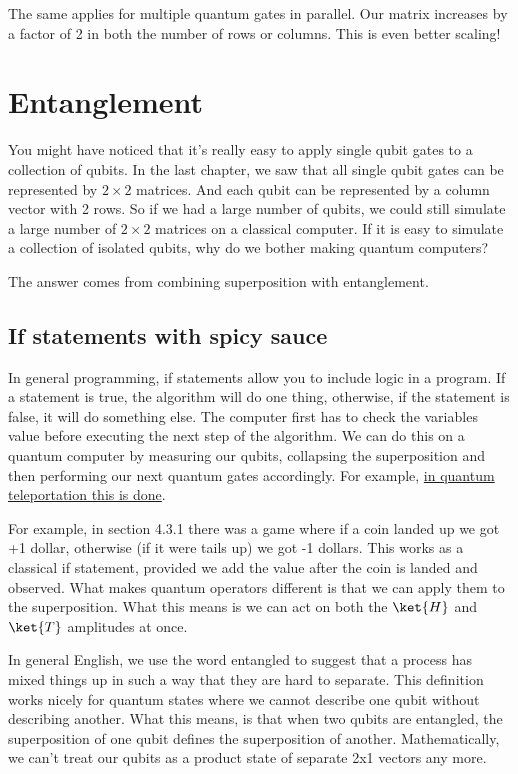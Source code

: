 \documentclass{book}
\begin{document}
The same applies for multiple quantum gates in parallel. Our matrix increases by a factor of 2 in both the number of rows or columns. This is even better scaling!

\section{ Entanglement } 

You might have noticed that it's really easy to apply single qubit gates to a collection of qubits. In the last chapter, we saw that all single qubit gates can be represented by $ 2 \times 2$ matrices. And each qubit can be represented by a column vector with 2 rows. So if we had a large number of qubits, we could still simulate a large number of $2 \times 2$ matrices on a classical computer. If it is easy to simulate a collection of isolated qubits, why do we bother making quantum computers? 

The answer comes from combining superposition with entanglement. 

\subsection{ If statements with spicy sauce }

In general programming, if statements allow you to include logic in a program. If a statement is true, the algorithm will do one thing, otherwise, if the statement is false, it will do something else. The computer first has to check the variables value before executing the next step of the algorithm. We can do this on a quantum computer by measuring our qubits, collapsing the superposition and then performing our next quantum gates accordingly. For example, \href{https://qiskit.org/textbook/ch-algorithms/teleportation.html}{in quantum teleportation this is done}. 

 For example, in section 4.3.1 there was a game where if a coin landed up we got +1 dollar, otherwise (if it were tails up) we got -1 dollars. This works as a classical if statement, provided we add the value after the coin is landed and observed. What makes quantum operators different is that we can apply them to the superposition. What this means is we can act on both the $\ket{H}$ and $\ket{T}$ amplitudes at once. 
 
 In general English, we use the word entangled to suggest that a process has mixed things up in such a way that they are hard to separate. This definition works nicely for quantum states where we cannot describe one qubit without describing another. What this means, is that when two qubits are entangled, the superposition of one qubit defines the superposition of another. Mathematically, we can't treat our qubits as a product state of separate 2x1 vectors any more. 
\end{document}
